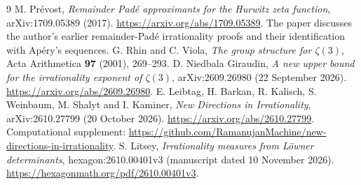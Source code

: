 \documentclass[11pt]{article}
\theoremstyle{definition}\newtheorem{definition}[theorem]{Definition}
\theoremstyle{remark}\newtheorem{remark}[theorem]{Remark}
\begin{document}
\begin{thebibliography}{9}
M. Pr\'evost, \emph{Remainder Pad\'e approximants for the Hurwitz zeta function}, arXiv:1709.05389 (2017).
\url{https://arxiv.org/abs/1709.05389}.
The paper discusses the author's earlier remainder-Pad\'e irrationality proofs and their identification with Ap\'ery's sequences.
G. Rhin and C. Viola, \emph{The group structure for $\zeta(3)$}, Acta Arithmetica \textbf{97} (2001), 269--293.
D. Niedbala Giraudin, \emph{A new upper bound for the irrationality exponent of $\zeta(3)$}, arXiv:2609.26980 (22 September 2026).
\url{https://arxiv.org/abs/2609.26980}.
E. Leibtag, H. Barkan, R. Kalisch, S. Weinbaum, M. Shalyt and I. Kaminer, \emph{New Directions in Irrationality}, arXiv:2610.27799 (20 October 2026).
\url{https://arxiv.org/abs/2610.27799}.
Computational supplement:
\url{https://github.com/RamanujanMachine/new-directions-in-irrationality}.
S. Litsey, \emph{Irrationality measures from L\"owner determinants}, hexagon:2610.00401v3 (manuscript dated 10 November 2026).
\url{https://hexagonmath.org/pdf/2610.00401v3}.
\end{thebibliography}
\end{document}

